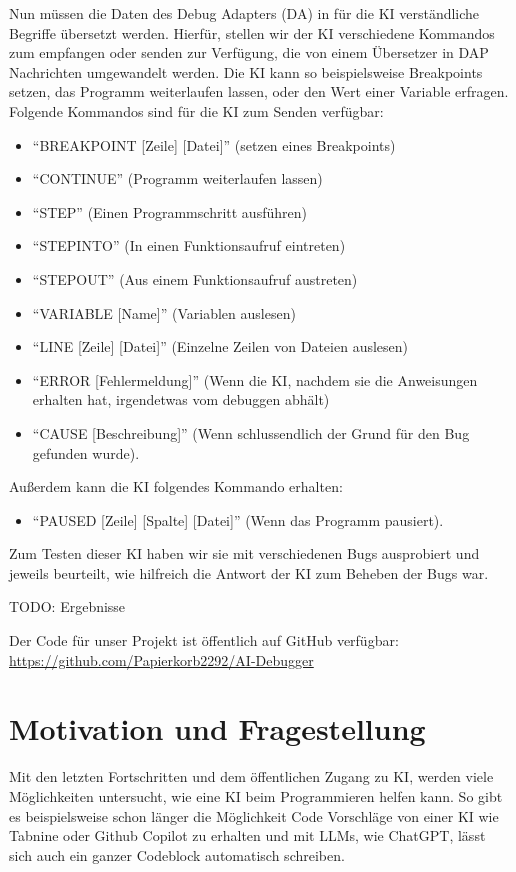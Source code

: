 \documentclass[a4paper,12pt,ngerman]{scrartcl}
\begin{document}
Nun müssen die Daten des Debug Adapters (DA) in für die KI verständliche Begriffe übersetzt werden. Hierfür, stellen wir der KI verschiedene Kommandos zum empfangen oder senden zur Verfügung, die von einem Übersetzer in DAP Nachrichten umgewandelt werden. Die KI kann so beispielsweise Breakpoints setzen, das Programm weiterlaufen lassen, oder den Wert einer Variable erfragen. Folgende Kommandos sind für die KI zum Senden verfügbar:
\begin{itemize}
	\item ``BREAKPOINT [Zeile] [Datei]'' (setzen eines Breakpoints)
	\item ``CONTINUE'' (Programm weiterlaufen lassen)
	\item ``STEP'' (Einen Programmschritt ausführen)
	\item ``STEPINTO'' (In einen Funktionsaufruf eintreten)
	\item ``STEPOUT'' (Aus einem Funktionsaufruf austreten)
	\item ``VARIABLE [Name]'' (Variablen auslesen)
	\item ``LINE [Zeile] [Datei]'' (Einzelne Zeilen von Dateien auslesen)
	\item ``ERROR [Fehlermeldung]'' (Wenn die KI, nachdem sie die Anweisungen erhalten hat, irgendetwas vom debuggen abhält)
	\item ``CAUSE [Beschreibung]'' (Wenn schlussendlich der Grund für den Bug gefunden wurde).
\end{itemize}
Außerdem kann die KI folgendes Kommando erhalten:
\begin{itemize}
	\item ``PAUSED [Zeile] [Spalte] [Datei]'' (Wenn das Programm pausiert).
\end{itemize}

Zum Testen dieser KI haben wir sie mit verschiedenen Bugs ausprobiert und jeweils beurteilt, wie hilfreich die Antwort der KI zum Beheben der Bugs war.

TODO: Ergebnisse

Der Code für unser Projekt ist öffentlich auf GitHub verfügbar: \url{https://github.com/Papierkorb2292/AI-Debugger}

\section{Motivation und Fragestellung}

Mit den letzten Fortschritten und dem öffentlichen Zugang zu KI, werden viele Möglichkeiten untersucht, wie eine KI beim Programmieren helfen kann. So gibt es beispielsweise schon länger die Möglichkeit Code Vorschläge von einer KI wie Tabnine oder Github Copilot zu erhalten und mit LLMs, wie ChatGPT, lässt sich auch ein ganzer Codeblock automatisch schreiben.
\end{document}
